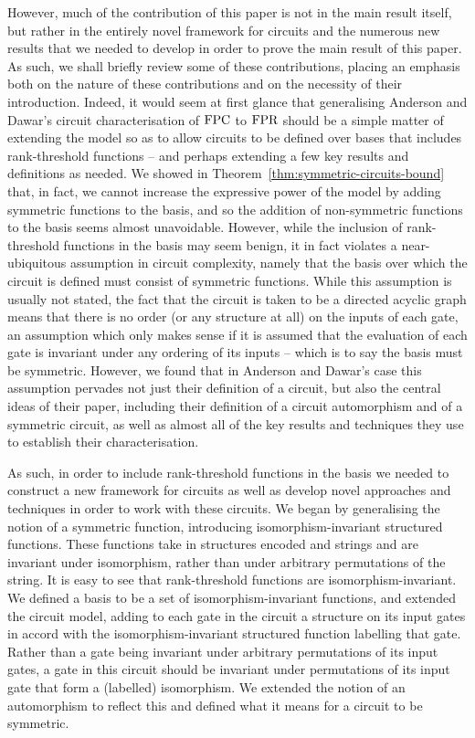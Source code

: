 \documentclass[../paper.tex]{subfiles}
\begin{document}
However, much of the contribution of this paper is not in the main result
itself, but rather in the entirely novel framework for circuits and the numerous
new results that we needed to develop in order to prove the main result of this
paper. As such, we shall briefly review some of these contributions, placing an
emphasis both on the nature of these contributions and on the necessity of their
introduction. Indeed, it would seem at first glance that generalising Anderson
and Dawar's circuit characterisation of $\text{\upshape FPC}$ to $\text{\upshape FPR}$ should be a simple
matter of extending the model so as to allow circuits to be defined over bases
that includes rank-threshold functions -- and perhaps extending a few key
results and definitions as needed. We showed in
Theorem~\ref{thm:symmetric-circuits-bound} that, in fact, we cannot increase the
expressive power of the model by adding symmetric functions to the basis, and so
the addition of non-symmetric functions to the basis seems almost unavoidable.
However, while the inclusion of rank-threshold functions in the basis may seem
benign, it in fact violates a near-ubiquitous assumption in circuit complexity,
namely that the basis over which the circuit is defined must consist of
symmetric functions. While this assumption is usually not stated, the fact that
the circuit is taken to be a directed acyclic graph means that there is no order
(or any structure at all) on the inputs of each gate, an assumption which only
makes sense if it is assumed that the evaluation of each gate is invariant under
any ordering of its inputs -- which is to say the basis must be symmetric.
However, we found that in Anderson and Dawar's case this assumption pervades not
just their definition of a circuit, but also the central ideas of their paper,
including their definition of a circuit automorphism and of a symmetric circuit,
as well as almost all of the key results and techniques they use to establish
their characterisation.

As such, in order to include rank-threshold functions in the basis we needed to
construct a new framework for circuits as well as develop novel approaches and
techniques in order to work with these circuits. We began by generalising the
notion of a symmetric function, introducing isomorphism-invariant structured
functions. These functions take in structures encoded and strings and are
invariant under isomorphism, rather than under arbitrary permutations of the
string. It is easy to see that rank-threshold functions are
isomorphism-invariant. We defined a basis to be a set of isomorphism-invariant
functions, and extended the circuit model, adding to each gate in the circuit a
structure on its input gates in accord with the isomorphism-invariant structured
function labelling that gate. Rather than a gate being invariant under arbitrary
permutations of its input gates, a gate in this circuit should be invariant
under permutations of its input gate that form a (labelled) isomorphism. We
extended the notion of an automorphism to reflect this and defined what it means
for a circuit to be symmetric.
\end{document}
